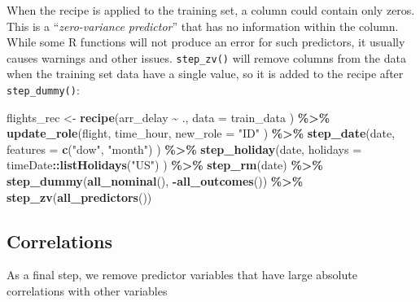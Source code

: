 \documentclass[
]{book}
\newenvironment{Shaded}{\begin{snugshade}}{\end{snugshade}}
\newcommand{\DataTypeTok}[1]{\textcolor[rgb]{0.13,0.29,0.53}{#1}}
\newcommand{\KeywordTok}[1]{\textcolor[rgb]{0.13,0.29,0.53}{\textbf{#1}}}
\newcommand{\NormalTok}[1]{#1}
\newcommand{\OperatorTok}[1]{\textcolor[rgb]{0.81,0.36,0.00}{\textbf{#1}}}
\newcommand{\StringTok}[1]{\textcolor[rgb]{0.31,0.60,0.02}{#1}}
\begin{document}
When the recipe is applied to the training set, a column could contain only zeros. This is a ``\emph{zero-variance predictor}'' that has no information within the column. While some R functions will not produce an error for such predictors, it usually causes warnings and other issues. \texttt{step\_zv()} will remove columns from the data when the training set data have a single value, so it is added to the recipe after \texttt{step\_dummy()}:

\begin{Shaded}
\begin{Highlighting}[]
\NormalTok{flights\_rec \textless{}{-}}
\StringTok{  }\KeywordTok{recipe}\NormalTok{(arr\_delay }\OperatorTok{\textasciitilde{}}\StringTok{ }\NormalTok{.,}
    \DataTypeTok{data =}\NormalTok{ train\_data}
\NormalTok{  ) }\OperatorTok{\%\textgreater{}\%}
\StringTok{  }\KeywordTok{update\_role}\NormalTok{(flight,}
\NormalTok{    time\_hour,}
    \DataTypeTok{new\_role =} \StringTok{"ID"}
\NormalTok{  ) }\OperatorTok{\%\textgreater{}\%}
\StringTok{  }\KeywordTok{step\_date}\NormalTok{(date,}
    \DataTypeTok{features =} \KeywordTok{c}\NormalTok{(}\StringTok{"dow"}\NormalTok{, }\StringTok{"month"}\NormalTok{)}
\NormalTok{  ) }\OperatorTok{\%\textgreater{}\%}
\StringTok{  }\KeywordTok{step\_holiday}\NormalTok{(date,}
    \DataTypeTok{holidays =}\NormalTok{ timeDate}\OperatorTok{::}\KeywordTok{listHolidays}\NormalTok{(}\StringTok{"US"}\NormalTok{)}
\NormalTok{  ) }\OperatorTok{\%\textgreater{}\%}
\StringTok{  }\KeywordTok{step\_rm}\NormalTok{(date) }\OperatorTok{\%\textgreater{}\%}
\StringTok{  }\KeywordTok{step\_dummy}\NormalTok{(}\KeywordTok{all\_nominal}\NormalTok{(), }\OperatorTok{{-}}\KeywordTok{all\_outcomes}\NormalTok{()) }\OperatorTok{\%\textgreater{}\%}
\StringTok{  }\KeywordTok{step\_zv}\NormalTok{(}\KeywordTok{all\_predictors}\NormalTok{())}
\end{Highlighting}
\end{Shaded}

\hypertarget{correlations}{%
\subsection{Correlations}\label{correlations}}

As a final step, we remove predictor variables that have large absolute correlations with other variables
\end{document}
